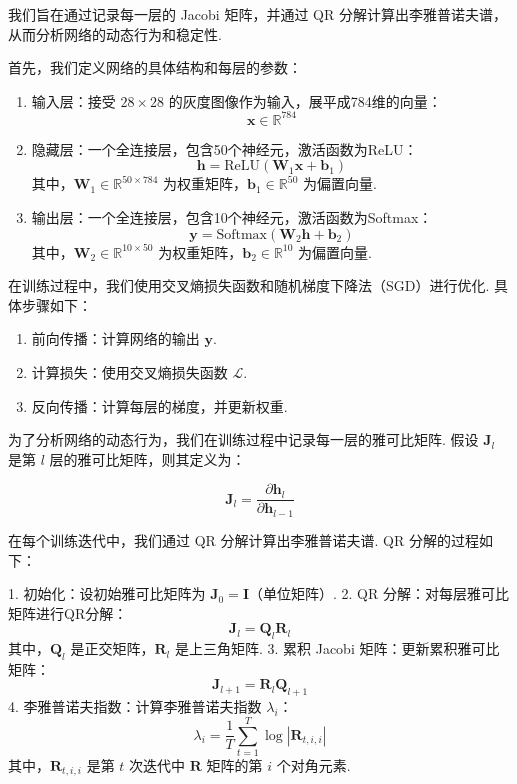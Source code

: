 我们旨在通过记录每一层的 Jacobi 矩阵，并通过 QR 分解计算出李雅普诺夫谱，从而分析网络的动态行为和稳定性. 

首先，我们定义网络的具体结构和每层的参数：

\begin{enumerate}
   \item 输入层：接受 $28\times28$ 的灰度图像作为输入，展平成784维的向量：
   \[
   \mathbf{x} \in \mathbb{R}^{784}
   \]

\item 隐藏层：一个全连接层，包含50个神经元，激活函数为ReLU：
   \[
   \mathbf{h} = \text{ReLU}(\mathbf{W}_1 \mathbf{x} + \mathbf{b}_1)
   \]
   其中，\(\mathbf{W}_1 \in \mathbb{R}^{50 \times 784}\) 为权重矩阵，\(\mathbf{b}_1 \in \mathbb{R}^{50}\) 为偏置向量. 

\item 输出层：一个全连接层，包含10个神经元，激活函数为Softmax：
   \[
   \mathbf{y} = \text{Softmax}(\mathbf{W}_2 \mathbf{h} + \mathbf{b}_2)
   \]
   其中，\(\mathbf{W}_2 \in \mathbb{R}^{10 \times 50}\) 为权重矩阵，\(\mathbf{b}_2 \in \mathbb{R}^{10}\) 为偏置向量. 
\end{enumerate}

在训练过程中，我们使用交叉熵损失函数和随机梯度下降法（SGD）进行优化. 具体步骤如下：

\begin{enumerate}
   \item 前向传播：计算网络的输出 \(\mathbf{y}\). 
   \item 计算损失：使用交叉熵损失函数 \(\mathcal{L}\). 
   \item 反向传播：计算每层的梯度，并更新权重. 
\end{enumerate}

为了分析网络的动态行为，我们在训练过程中记录每一层的雅可比矩阵. 假设 \(\mathbf{J}_l\) 是第 \(l\) 层的雅可比矩阵，则其定义为：

\[
\mathbf{J}_l = \frac{\partial \mathbf{h}_l}{\partial \mathbf{h}_{l-1}}
\]

在每个训练迭代中，我们通过 QR 分解计算出李雅普诺夫谱. QR 分解的过程如下：

1. 初始化：设初始雅可比矩阵为 \(\mathbf{J}_0 = \mathbf{I}\)（单位矩阵）. 
2. QR 分解：对每层雅可比矩阵进行QR分解：
   \[
   \mathbf{J}_l = \mathbf{Q}_l \mathbf{R}_l
   \]
   其中，\(\mathbf{Q}_l\) 是正交矩阵，\(\mathbf{R}_l\) 是上三角矩阵. 
3. 累积 Jacobi 矩阵：更新累积雅可比矩阵：
   \[
   \mathbf{J}_{l+1} = \mathbf{R}_l \mathbf{Q}_{l+1}
   \]
4. 李雅普诺夫指数：计算李雅普诺夫指数 \(\lambda_i\)：
   \[
   \lambda_i = \frac{1}{T} \sum_{t=1}^T \log |\mathbf{R}_{t,i,i}|
   \]
   其中，\(\mathbf{R}_{t,i,i}\) 是第 \(t\) 次迭代中 \(\mathbf{R}\) 矩阵的第 \(i\) 个对角元素. 

